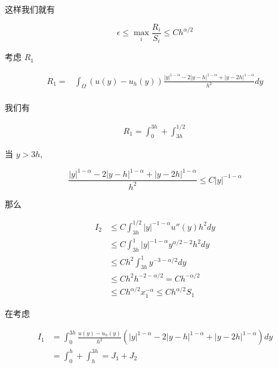 \documentclass{ctexart}
\theoremstyle{definition}
\theoremstyle{remark}
\numberwithin{equation}{section}
\begin{document}
这样我们就有

\begin{equation}
    \epsilon \le \max_i \frac{R_i}{S_i} \le Ch^{\alpha/2}
\end{equation}

考虑 \(R_1\)

\begin{equation}
    \begin{aligned}
        R_1 = & \int_\Omega (u(y) - u_h(y)) \frac{ |y|^{1-\alpha} - 2|y-h|^{1-\alpha} + |y-2h|^{1-\alpha} }{h^2} dy \\
    \end{aligned}
\end{equation}


我们有

\begin{equation}
    \begin{aligned}
        R_1 = \int_0^{3h} + \int_{3h}^{1/2}
    \end{aligned}
\end{equation}

当 \(y>3h\),

\begin{equation}
    \frac{ |y|^{1-\alpha} - 2|y-h|^{1-\alpha} + |y-2h|^{1-\alpha} }{h^2} \le C |y|^{-1-\alpha}
\end{equation}

那么

\begin{equation}
    \begin{aligned}
        I_2 & \le  C \int_{3h}^{1/2} |y|^{-1-\alpha} u''(y) h^2 dy       \\
            & \le  C \int_{3h}^{1} |y|^{-1-\alpha} y^{\alpha/2-2} h^2 dy \\
            & \le C h^{2}  \int_{3h}^{1} y^{-3-\alpha/2} dy              \\
            & \le C h^{2} h^{-2-\alpha/2} = C h^{-\alpha/2}              \\
            & \le C h^{\alpha/2} x_1^{-\alpha} \le C h^{\alpha/2} S_1
    \end{aligned}
\end{equation}

在考虑

\begin{equation}
    \begin{aligned}
        I_1 & = \int_0^{3h}  \frac{ u(y) - u_h(y) }{h^2} (|y|^{1-\alpha} - 2|y-h|^{1-\alpha} + |y-2h|^{1-\alpha}) dy \\
            & = \int_0^h + \int_h^{3h} = J_1 + J_2
    \end{aligned}
\end{equation}
\end{document}
